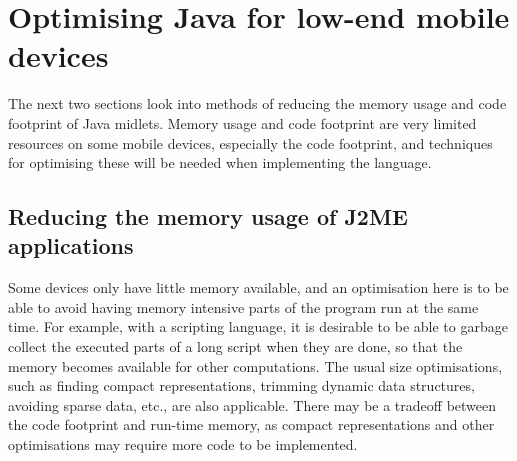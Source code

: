 \documentclass[11pt]{report}
\begin{document}
%
%
%
%
%

\section{Optimising Java for low-end mobile devices}
\label{j2mesection}
The next two sections look into methods of reducing the memory usage and code footprint of Java midlets.
Memory usage and code footprint are very limited resources on some mobile devices, especially the code footprint, and techniques for optimising these will be needed when implementing the language.

\subsection{Reducing the memory usage of J2ME applications}

Some devices only have little memory available,
and an optimisation here is to be able to avoid having memory intensive parts of the program run at the same time. For example, with a scripting language, it is desirable to be able to garbage collect the executed parts of a long script when they are done, so that the memory becomes available for other computations.
The usual size optimisations, such as finding compact representations, trimming dynamic data structures, avoiding sparse data, etc., are also applicable.
There may be a tradeoff between the code footprint and run-time memory, as compact representations and other optimisations may require more code to be implemented.
\end{document}

